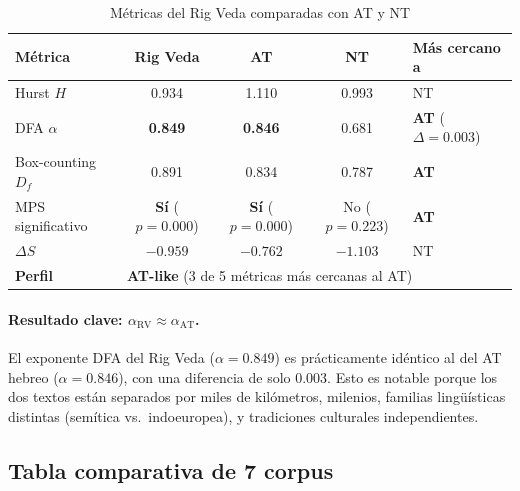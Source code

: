 \documentclass[12pt,a4paper]{article}
\newcommand{\val}[1]{\textcolor{hlcolor}{\textbf{#1}}}
\begin{document}
\begin{table}[H]
\centering
\caption{M\'etricas del Rig Veda comparadas con AT y NT}
\label{tab:rigveda}
\begin{tabular}{lcccl}
\toprule
\textbf{M\'etrica} & \textbf{Rig Veda} & \textbf{AT} & \textbf{NT} & \textbf{M\'as cercano a} \\
\midrule
Hurst $H$        & 0.934 & 1.110 & 0.993 & NT \\
DFA $\alpha$     & \val{0.849} & \val{0.846} & 0.681 & \textbf{AT} ($\Delta = 0.003$) \\
Box-counting $D_f$ & 0.891 & 0.834 & 0.787 & \textbf{AT} \\
MPS significativo & \val{S\'i} ($p=0.000$) & \val{S\'i} ($p=0.000$) & No ($p=0.223$) & \textbf{AT} \\
$\Delta S$       & $-0.959$ & $-0.762$ & $-1.103$ & NT \\
\midrule
\textbf{Perfil}  & \multicolumn{4}{l}{\textbf{AT-like} (3 de 5 m\'etricas m\'as cercanas al AT)} \\
\bottomrule
\end{tabular}
\end{table}

\paragraph{Resultado clave: $\alpha_{\text{RV}} \approx \alpha_{\text{AT}}$.}
El exponente DFA del Rig Veda ($\alpha = 0.849$) es pr\'acticamente id\'entico al del AT
hebreo ($\alpha = 0.846$), con una diferencia de solo $0.003$. Esto es notable porque
los dos textos est\'an separados por miles de kil\'ometros, milenios, familias
ling\"u\'isticas distintas (sem\'itica vs.\ indoeuropea), y tradiciones culturales
independientes.

\subsection{Tabla comparativa de 7 corpus}
\end{document}
